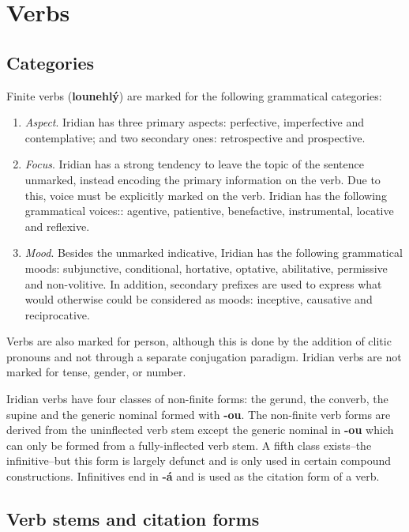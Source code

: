 \chapter{Verbs}
\section{Categories}
\par Finite verbs (\textbf{lounehlý}) are marked for the following grammatical categories:
\begin{enumerate}
	\item \textit{Aspect}. Iridian has three primary aspects: perfective, imperfective and contemplative; and two secondary ones: retrospective and prospective.
	\item \textit{Focus}. Iridian has a strong tendency to leave the topic of the sentence unmarked, instead encoding the primary information on the verb. Due to this, voice must be explicitly marked on the verb. Iridian has the following grammatical voices:: agentive, patientive, benefactive, instrumental, locative and reflexive.
	\item \textit{Mood}. Besides the unmarked indicative, Iridian has the following grammatical moods: subjunctive, conditional, hortative, optative, abilitative, permissive and non-volitive. In addition, secondary prefixes are used to express what would otherwise could be considered as moods: inceptive, causative and reciprocative.
\end{enumerate}

\par Verbs are also marked for person, although this is done by the addition of clitic pronouns and not through a separate conjugation paradigm. Iridian verbs are not marked for tense, gender, or number.
\par Iridian verbs have four classes of non-finite forms: the gerund, the converb, the supine and the generic nominal formed with \textbf{-ou}. The non-finite verb forms are derived from the uninflected verb stem except the generic nominal in \textbf{-ou} which can only be formed from a fully-inflected verb stem. A fifth class exists--the infinitive--but this form is largely defunct and is only used in certain compound constructions. Infinitives end in \textbf{-á} and is used as the citation form of a verb.

\section{Verb stems and citation forms}

